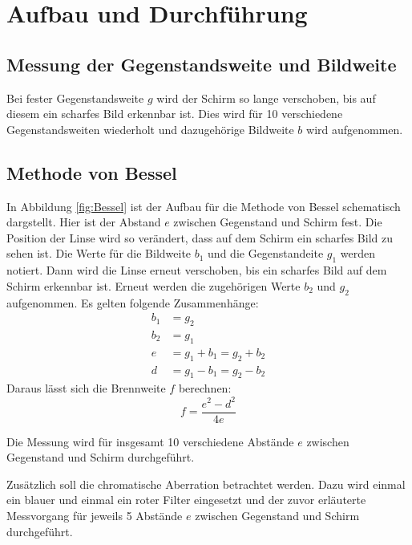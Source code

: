 \section {Aufbau und Durchführung}
\label{sec:durchführung}
\subsection{Messung der Gegenstandsweite und Bildweite}
Bei fester Gegenstandsweite $g$ wird der Schirm so lange verschoben, bis auf diesem ein scharfes Bild erkennbar ist. Dies wird für 10 verschiedene Gegenstandsweiten wiederholt und dazugehörige Bildweite $b$ wird aufgenommen.

\subsection{Methode von Bessel}
\label{sec:bessel}
In Abbildung \ref{fig:Bessel} ist der Aufbau für die Methode von Bessel schematisch dargstellt. Hier ist der Abstand $e$ zwischen Gegenstand und Schirm fest. Die Position der Linse wird so verändert, dass auf dem Schirm ein scharfes Bild zu sehen ist. Die Werte für die Bildweite $b_1$ und die Gegenstandeite $g_1$ werden notiert. Dann wird die Linse erneut verschoben, bis ein scharfes Bild auf dem Schirm erkennbar ist. Erneut werden die zugehörigen Werte $b_2$ und $g_2$ aufgenommen.
Es gelten folgende Zusammenhänge:
\begin{align}
  b_1 &= g_2 \\
  b_2 &= g_1 \\
  e &= g_1+b_1 =g_2+b_2 \\
  d &= g_1 - b_1 = g_2 -b_2
\end{align}
Daraus lässt sich die Brennweite $f$ berechnen:
\begin{equation}
  f = \frac{e^2 - d^2}{4e}
\end{equation}

Die Messung wird für insgesamt 10 verschiedene Abstände $e$ zwischen Gegenstand und Schirm durchgeführt.

Zusätzlich soll die chromatische Aberration betrachtet werden. Dazu wird einmal ein blauer und einmal ein roter Filter eingesetzt und der zuvor erläuterte Messvorgang für jeweils 5 Abstände $e$ zwischen Gegenstand und Schirm durchgeführt.

